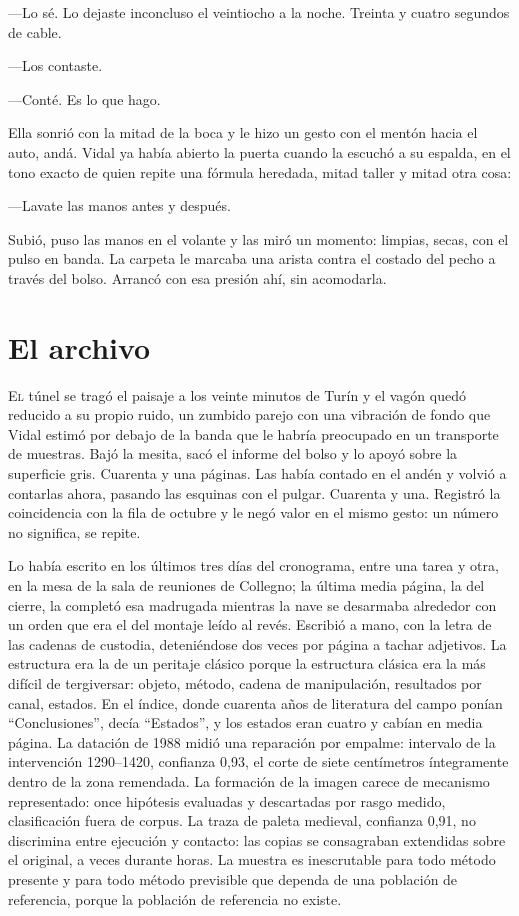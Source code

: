 ---Lo sé. Lo dejaste inconcluso el veintiocho a la noche. Treinta y cuatro segundos de cable.

---Los contaste.

---Conté. Es lo que hago.

Ella sonrió con la mitad de la boca y le hizo un gesto con el mentón hacia el auto, andá. Vidal ya había abierto la puerta cuando la escuchó a su espalda, en el tono exacto de quien repite una fórmula heredada, mitad taller y mitad otra cosa:

---Lavate las manos antes y después.

Subió, puso las manos en el volante y las miró un momento: limpias, secas, con el pulso en banda. La carpeta le marcaba una arista contra el costado del pecho a través del bolso. Arrancó con esa presión ahí, sin acomodarla.

\clearpage

\chapter{El archivo}

\lettrine[lines=2, lhang=0.1, nindent=0.2em]{E}{l} túnel se tragó el paisaje a los veinte minutos de Turín y el vagón quedó reducido a su propio ruido, un zumbido parejo con una vibración de fondo que Vidal estimó por debajo de la banda que le habría preocupado en un transporte de muestras. Bajó la mesita, sacó el informe del bolso y lo apoyó sobre la superficie gris. Cuarenta y una páginas. Las había contado en el andén y volvió a contarlas ahora, pasando las esquinas con el pulgar. Cuarenta y una. Registró la coincidencia con la fila de octubre y le negó valor en el mismo gesto: un número no significa, se repite.


Lo había escrito en los últimos tres días del cronograma, entre una tarea y otra, en la mesa de la sala de reuniones de Collegno; la última media página, la del cierre, la completó esa madrugada mientras la nave se desarmaba alrededor con un orden que era el del montaje leído al revés. Escribió a mano, con la letra de las cadenas de custodia, deteniéndose dos veces por página a tachar adjetivos. La estructura era la de un peritaje clásico porque la estructura clásica era la más difícil de tergiversar: objeto, método, cadena de manipulación, resultados por canal, estados. En el índice, donde cuarenta años de literatura del campo ponían ``Conclusiones'', decía ``Estados'', y los estados eran cuatro y cabían en media página. La datación de 1988 midió una reparación por empalme: intervalo de la intervención 1290--1420, confianza 0,93, el corte de siete centímetros íntegramente dentro de la zona remendada. La formación de la imagen carece de mecanismo representado: once hipótesis evaluadas y descartadas por rasgo medido, clasificación fuera de corpus. La traza de paleta medieval, confianza 0,91, no discrimina entre ejecución y contacto: las copias se consagraban extendidas sobre el original, a veces durante horas. La muestra es inescrutable para todo método presente y para todo método previsible que dependa de una población de referencia, porque la población de referencia no existe.

